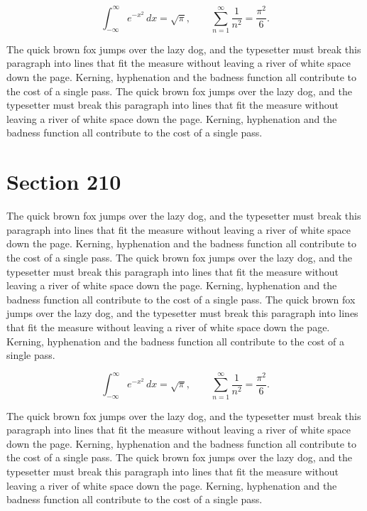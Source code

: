 \documentclass{article}
\begin{document}
\begin{equation}
\int_{-\infty}^{\infty} e^{-x^{2}}\,dx = \sqrt{\pi}, \qquad
\sum_{n=1}^{\infty} \frac{1}{n^{2}} = \frac{\pi^{2}}{6}.
\end{equation}

The quick brown fox jumps over the lazy dog, and the typesetter must break this paragraph into lines that fit the measure without leaving a river of white space down the page. Kerning, hyphenation and the badness function all contribute to the cost of a single pass. The quick brown fox jumps over the lazy dog, and the typesetter must break this paragraph into lines that fit the measure without leaving a river of white space down the page. Kerning, hyphenation and the badness function all contribute to the cost of a single pass. 
\section{Section 210}
The quick brown fox jumps over the lazy dog, and the typesetter must break this paragraph into lines that fit the measure without leaving a river of white space down the page. Kerning, hyphenation and the badness function all contribute to the cost of a single pass. The quick brown fox jumps over the lazy dog, and the typesetter must break this paragraph into lines that fit the measure without leaving a river of white space down the page. Kerning, hyphenation and the badness function all contribute to the cost of a single pass. The quick brown fox jumps over the lazy dog, and the typesetter must break this paragraph into lines that fit the measure without leaving a river of white space down the page. Kerning, hyphenation and the badness function all contribute to the cost of a single pass. 

\begin{equation}
\int_{-\infty}^{\infty} e^{-x^{2}}\,dx = \sqrt{\pi}, \qquad
\sum_{n=1}^{\infty} \frac{1}{n^{2}} = \frac{\pi^{2}}{6}.
\end{equation}

The quick brown fox jumps over the lazy dog, and the typesetter must break this paragraph into lines that fit the measure without leaving a river of white space down the page. Kerning, hyphenation and the badness function all contribute to the cost of a single pass. The quick brown fox jumps over the lazy dog, and the typesetter must break this paragraph into lines that fit the measure without leaving a river of white space down the page. Kerning, hyphenation and the badness function all contribute to the cost of a single pass. 
\end{document}
